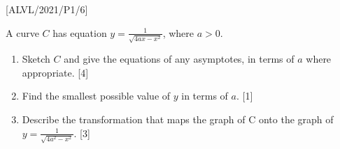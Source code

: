 \item {[}ALVL/2021/P1/6{]}

A curve $C$ has equation $y=\frac{1}{\sqrt{4ax-x^{2}}}$, where $a>0$. 
\begin{enumerate}
\item Sketch $C$ and give the equations of any asymptotes, in terms of
$a$ where appropriate. \hfill{}{[}4{]}
\item Find the smallest possible value of $y$ in terms of $a$.\hfill{}
{[}1{]}
\item Describe the transformation that maps the graph of C onto the graph
of $y=\frac{1}{\sqrt{4a^{2}-x^{2}}}$. \hfill{}{[}3{]}
\end{enumerate}
